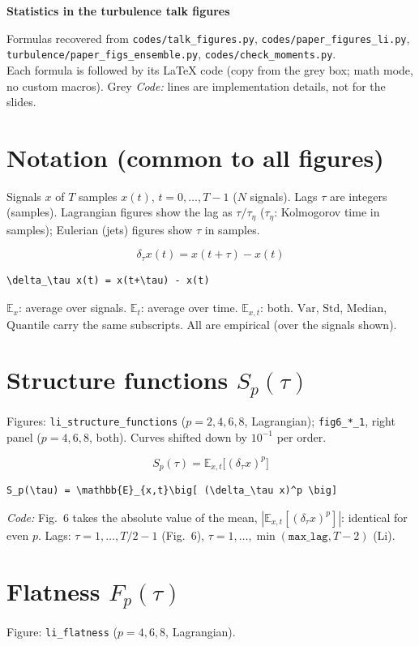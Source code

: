 \documentclass[11pt]{article}
\newcommand{\codenote}[1]{{\small\color{notegray}\emph{Code:} #1\par}}
\begin{document}
{\LARGE\bfseries Statistics in the turbulence talk figures}\par\smallskip
{\small Formulas recovered from \texttt{codes/talk\_figures.py}, \texttt{codes/paper\_figures\_li.py},\\
\texttt{turbulence/paper\_figs\_ensemble.py}, \texttt{codes/check\_moments.py}.\\
Each formula is followed by its LaTeX code (copy from the grey box; math mode, no custom macros).
Grey \emph{Code:} lines are implementation details, not for the slides.}

\section{Notation (common to all figures)}
Signals $x$ of $T$ samples $x(t)$, $t = 0,\dots,T-1$ ($N$ signals). Lags $\tau$ are integers (samples). Lagrangian figures show the lag as $\tau/\tau_\eta$ ($\tau_\eta$: Kolmogorov time in samples); Eulerian (jets) figures show $\tau$ in samples.

\[
\delta_\tau x(t) = x(t+\tau) - x(t)
\]
\begin{lstlisting}
\delta_\tau x(t) = x(t+\tau) - x(t)
\end{lstlisting}
$\mathbb{E}_x$: average over signals. $\mathbb{E}_t$: average over time. $\mathbb{E}_{x,t}$: both. $\mathrm{Var}$, $\mathrm{Std}$, $\mathrm{Median}$, $\mathrm{Quantile}$ carry the same subscripts. All are empirical (over the signals shown).

\section{Structure functions $S_p(\tau)$}
Figures: \texttt{li\_structure\_functions} ($p = 2,4,6,8$, Lagrangian); \texttt{fig6\_*\_1}, right panel ($p = 4,6,8$, both). Curves shifted down by $10^{-1}$ per order.

\[
S_p(\tau) = \mathbb{E}_{x,t}\big[ (\delta_\tau x)^p \big]
\]
\begin{lstlisting}
S_p(\tau) = \mathbb{E}_{x,t}\big[ (\delta_\tau x)^p \big]
\end{lstlisting}
\codenote{Fig.~6 takes the absolute value of the mean, $|\mathbb{E}_{x,t}[(\delta_\tau x)^p]|$: identical for even $p$. Lags: $\tau = 1,\dots,T/2-1$ (Fig.~6), $\tau = 1,\dots,\min(\texttt{max\_lag}, T-2)$ (Li).}
\section{Flatness $F_p(\tau)$}
Figure: \texttt{li\_flatness} ($p = 4,6,8$, Lagrangian).
\end{document}
